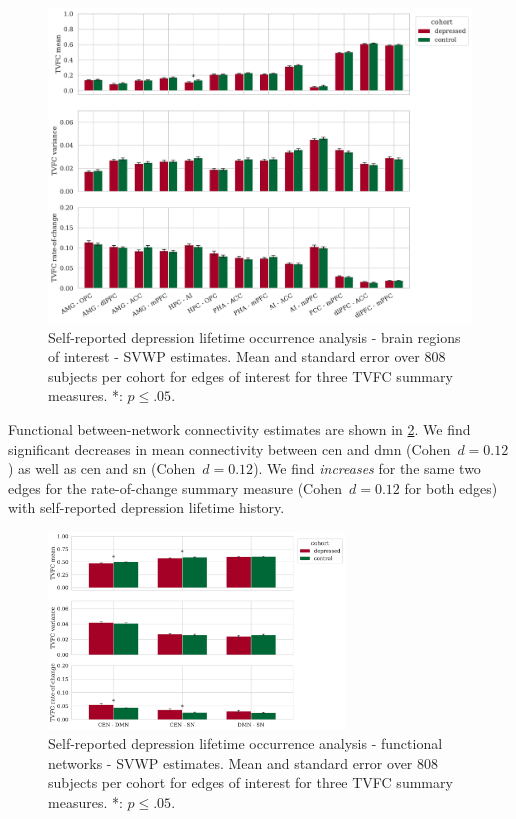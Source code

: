 \begin{figure}[t]
  \centering
  \includegraphics[width=\textwidth]{fig/ukbiobank/TVFC_predictions_summaries/lifetime_occurrence/cohort_comparison/ROI/correlation_all_TVFC_summary_measures_SVWP_joint_edges_of_interest}
  \caption{
    Self-reported depression lifetime occurrence analysis - brain regions of interest - SVWP estimates.
    Mean and standard error over 808 subjects per cohort for edges of interest for three TVFC summary measures.
    *: $p \leq .05$.
  }\label{fig:ukb-results-lo-roi-cohort-comparison-edges-of-interest-wp}
\end{figure}


Functional between-network connectivity estimates are shown in \cref{fig:ukb-results-lo-fn-cohort-comparison-edges-of-interest-wp}.
We find significant decreases in mean connectivity between \gls{cen} and \gls{dmn} (Cohen~$d = 0.12$) as well as \gls{cen} and \gls{sn} (Cohen~$d = 0.12$).
We find \emph{increases} for the same two edges for the rate-of-change summary measure (Cohen~$d = 0.12$ for both edges) with self-reported depression lifetime history.


\begin{figure}[h]
  \centering
  \includegraphics[width=0.7\textwidth]{fig/ukbiobank/TVFC_predictions_summaries/lifetime_occurrence/cohort_comparison/FN/correlation_all_TVFC_summary_measures_SVWP_joint_edges_of_interest}
  \caption{
    Self-reported depression lifetime occurrence analysis - functional networks - SVWP estimates.
    Mean and standard error over 808 subjects per cohort for edges of interest for three TVFC summary measures.
    *: $p \leq .05$.
  }\label{fig:ukb-results-lo-fn-cohort-comparison-edges-of-interest-wp}
\end{figure}


